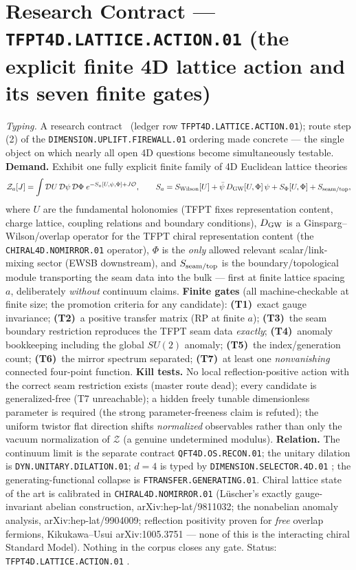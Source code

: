 \documentclass[11pt,a4paper]{article}
\begin{document}
\section*{Research Contract --- \texttt{TFPT4D.LATTICE.ACTION.01} (the explicit finite 4D lattice action and its seven finite gates)}
\noindent\emph{Typing.} A research contract \mO\ (ledger row \texttt{TFPT4D.LATTICE.ACTION.01});
route step (2) of the \texttt{DIMENSION.UPLIFT.FIREWALL.01} ordering made concrete --- the
single object on which nearly all open 4D questions become simultaneously testable.
\textbf{Demand.}  Exhibit one fully explicit finite family of 4D Euclidean lattice theories
\[
\mathcal Z_a[J]=\int\mathcal DU\,\mathcal D\psi\,\mathcal D\Phi\;
e^{-S_a[U,\psi,\Phi]+J\mathcal O},
\qquad
S_a=S_{\rm Wilson}[U]+\bar\psi\,D_{\rm GW}[U,\Phi]\,\psi+S_\Phi[U,\Phi]+S_{\rm seam/top},
\]
where $U$ are the fundamental holonomies (TFPT fixes representation content, charge lattice,
coupling relations and boundary conditions), $D_{\rm GW}$ is a Ginsparg--Wilson/overlap operator
for the TFPT chiral representation content (the \texttt{CHIRAL4D.NOMIRROR.01} operator), $\Phi$
is the \emph{only} allowed relevant scalar/link-mixing sector (EWSB downstream), and
$S_{\rm seam/top}$ is the boundary/topological module transporting the seam data into the bulk
--- first at finite lattice spacing $a$, deliberately \emph{without} continuum claims.
\textbf{Finite gates} (all machine-checkable at finite size; the promotion criteria for any
candidate): \textbf{(T1)}~exact gauge invariance; \textbf{(T2)}~a positive transfer matrix (RP
at finite $a$); \textbf{(T3)}~the seam boundary restriction reproduces the TFPT seam data
\emph{exactly}; \textbf{(T4)}~anomaly bookkeeping including the global $SU(2)$ anomaly;
\textbf{(T5)}~the index/generation count; \textbf{(T6)}~the mirror spectrum separated;
\textbf{(T7)}~at least one \emph{nonvanishing} connected four-point function.
\textbf{Kill tests.}  No local reflection-positive action with the correct seam restriction
exists (master route dead); every candidate is generalized-free (T7 unreachable); a hidden
freely tunable dimensionless parameter is required (the strong parameter-freeness claim is
refuted); the uniform twistor flat direction shifts \emph{normalized} observables rather than
only the vacuum normalization of $\mathcal Z$ (a genuine undetermined modulus).
\textbf{Relation.}  The continuum limit is the separate contract \texttt{QFT4D.OS.RECON.01};
the unitary dilation is \texttt{DYN.UNITARY.DILATION.01}; $d=4$ is typed by
\texttt{DIMENSION.SELECTOR.4D.01} \mC; the generating-functional collapse is
\texttt{FTRANSFER.GENERATING.01}.  Chiral lattice state of the art is calibrated in
\texttt{CHIRAL4D.NOMIRROR.01} (L\"uscher's exactly gauge-invariant abelian construction,
arXiv:hep-lat/9811032; the nonabelian anomaly analysis, arXiv:hep-lat/9904009; reflection
positivity proven for \emph{free} overlap fermions, Kikukawa--Usui arXiv:1005.3751 --- none of
this is the interacting chiral Standard Model).  Nothing in the corpus closes any gate.
Status: \texttt{TFPT4D.LATTICE.ACTION.01} \mO.
\end{document}
